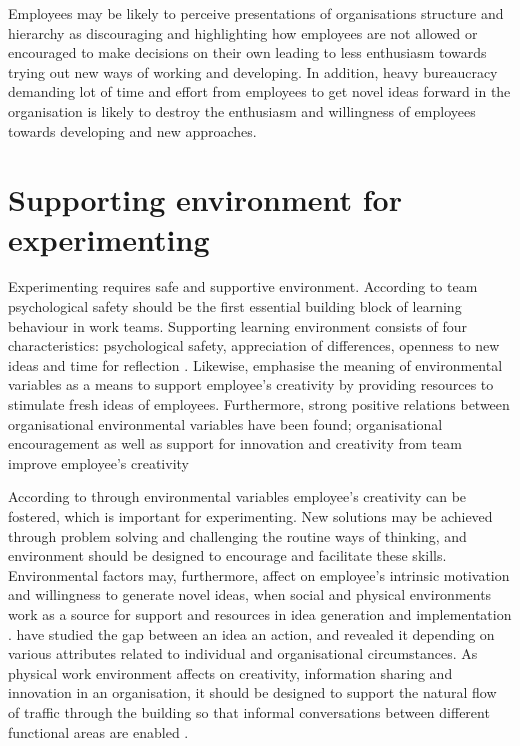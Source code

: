 Employees may be likely to perceive presentations of organisations structure and hierarchy as discouraging and highlighting how employees are not allowed or encouraged to make decisions on their own leading to less enthusiasm towards trying out new ways of working and developing. In addition, heavy bureaucracy demanding lot of time and effort from employees to get novel ideas forward in the organisation is likely to destroy the enthusiasm and willingness of employees towards developing and new approaches. \citep{shalley2004leaders}


\section{Supporting environment for experimenting}
Experimenting requires safe and supportive environment. According to \citet{edmondson1999psychological} team psychological safety should be the first essential building block of learning behaviour in work teams. Supporting learning environment consists of four characteristics: psychological safety, appreciation of differences, openness to new ideas and time for reflection \citep{garvin2008yours}. Likewise, \citet{mumford1988creativity} emphasise the meaning of environmental variables as a means to support employee's creativity by providing resources to stimulate fresh ideas of employees. Furthermore, strong positive relations between organisational environmental variables have been found; organisational encouragement as well as support for innovation and creativity from team improve employee's creativity \citep{amabile1996assessing}

According to \citet{mumford1988creativity} through environmental variables employee's creativity can be fostered, which is important for experimenting. New solutions may be achieved through problem solving and challenging the routine ways of thinking, and environment should be designed to encourage and facilitate these skills. Environmental factors may, furthermore, affect on employee's intrinsic motivation and willingness to generate novel ideas, when social and physical environments work as a source for support and resources in idea generation and implementation \citep{amabile1998kill,mumford1988creativity}. \citet{mumford1988creativity} have studied the gap between an idea an action, and revealed it depending on various attributes related to individual and organisational circumstances. As physical work environment affects on creativity, information sharing and innovation in an organisation, it should be designed to support the natural flow of traffic through the building so that informal conversations between different functional areas are enabled \citep{shalley2004leaders}. 


